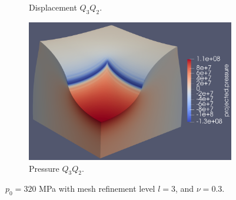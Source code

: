 \documentclass{beamer}
\begin{document}
\begin{frame}
\begin{figure}[H]
\begin{subfigure}{.5\textwidth}
			\caption{Displacement $Q_3Q_2$.}
		\end{subfigure}%
		\begin{subfigure}{.5\textwidth}
			\centering
			\includegraphics[width=.68\textwidth]{../figs/p-Q3Q2-320MPa-0.3.png}
			\caption{Pressure $Q_3Q_2$.}
		\end{subfigure}
		\caption*{$p_0=320$ MPa with mesh refinement level $l=3$, and \alert{$\nu = 0.3$}.}
	\end{figure}
\end{frame}
\end{document}
